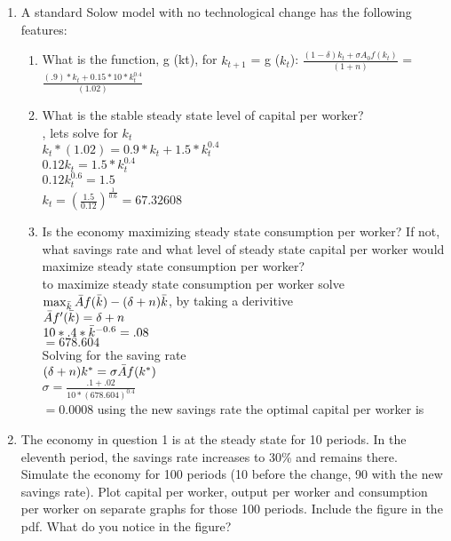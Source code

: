 \documentclass[12pt,oneside,reqno]{amsart}
\begin{document}
\begin{enumerate}
    \item A standard Solow model with no technological change has the following features:
    \begin{enumerate}
        \item What is the function, g (kt), for $k_{t+1}$ = g ($k_t$): $\frac{(1-\delta)k_t+\sigma A_0 f(k_t)}{(1+n)}$ = $\frac{(.9)*k_t+0.15*10 *k_t^{0.4}}{(1.02)}$
        \item What is the stable steady state level of capital per worker? \\
        $ $, lets solve for $k_t$ \\
        $k_t*(1.02) = 0.9*k_t+1.5*k_t^{0.4}$\\
        $0.12k_t=1.5*k_t^{0.4}$\\
        $0.12k_t^{0.6}=1.5$\\
        $k_t=(\frac{1.5}{0.12})^{\frac{1}{0.6}}=67.32608$
        
        \item Is the economy maximizing steady state consumption per worker? If not, what savings rate and what level of steady state capital per worker would maximize steady state consumption per worker?\\
        to maximize steady state consumption per worker solve\\ $\max_{\Bar{k}} \Bar{A}f(\Bar{k})-(\delta+n)\Bar{k}$, by taking a derivitive\\
        $\Bar{A}f'(\Bar{k})=\delta+n$\\
        $10*.4*\Bar{k}^{-0.6}=.08$\\
        $=678.604$\\
        Solving for the saving rate\\
        $(\delta+n)k^*=\sigma\Bar{A}f(k^*)$\\
        $\sigma = \frac{.1+.02}{10*(678.604)^{0.4}}$\\
        $=0.0008$ using the new savings rate the optimal capital per worker is\\
    \end{enumerate}
    \item The economy in question 1 is at the steady state for 10 periods. In the eleventh period, the savings rate increases to 30\% and remains there. Simulate the economy for 100 periods (10 before the change, 90 with the new savings rate). Plot capital per worker, output per worker and consumption per worker on separate graphs for those 100 periods. Include the figure in the pdf. What do you notice in the figure?
\end{enumerate}
\end{document}
